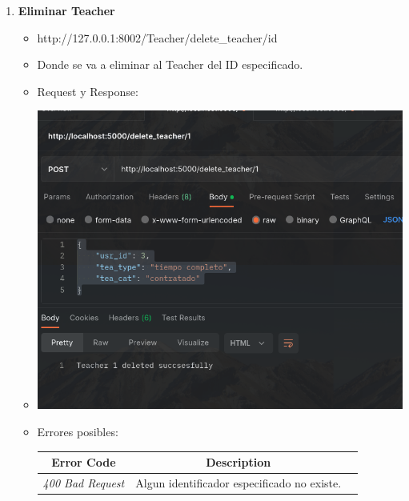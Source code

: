 \documentclass{article}
\begin{document}
\begin{enumerate}
    \item \textbf{Eliminar Teacher}
    \begin{itemize}
        \item http://127.0.0.1:8002/Teacher/delete\_teacher/id
        \item Donde se va a eliminar al Teacher del ID especificado.
        \item Request y Response:
        \item \includegraphics[scale=.5]{assets/teacher/delete.png}
        \item Errores posibles: \begin{table}[H] \centering
        \begin{tabular}{|c|c|l|} \hline \textbf{Error Code} &
        \textbf{Description} \\ \hline \textit{400 Bad Request} & Algun
        identificador especificado no existe. \\ \hline \end{tabular}
        \end{table}
    \end{itemize}
\end{enumerate}

\end{document}
